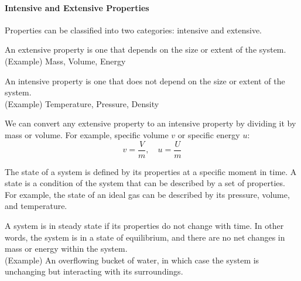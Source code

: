 \documentclass[11pt]{report}
\begin{document}
\paragraph{Intensive and Extensive Properties} Properties can be classified into two categories: intensive and extensive.
\begin{definition}
    An extensive property is one that depends on the size or extent of the system. \\
    (Example) Mass, Volume, Energy
\end{definition}    
\begin{definition}
    An intensive property is one that does not depend on the size or extent of the system. \\ 
    (Example) Temperature, Pressure, Density 

    We can convert any extensive property to an intensive property by dividing it by mass or volume. For example, specific volume $v$ or specific energy $u$:
    $$
        v = \frac{V}{m}, \quad u = \frac{U}{m}
    $$
\end{definition}

\begin{definition}[State]
    The state of a system is defined by its properties at a specific moment in time. A state is a condition of the system that can be described by a set of properties. For example, the state of an ideal gas can be described by its pressure, volume, and temperature.
    
\end{definition}

\begin{definition}
    A system is in steady state if its properties do not change with time. In other words, the system is in a state of equilibrium, and there are no net changes in mass or energy within the system. \\
    (Example) An overflowing bucket of water, in which case the system is unchanging but interacting with its surroundings.
\end{definition}
\end{document}
